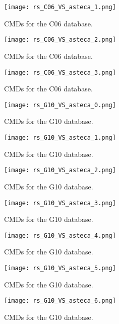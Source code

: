 \documentclass{aa}
\begin{document}
\begin{appendix}
\begin{figure*}
\texttt{[image: rs\_C06\_VS\_asteca\_1.png]}
\caption{CMDs for the C06 database.}
\label{fig:DBs_C06_1}
\end{figure*}
\clearpage

\begin{figure*}
\texttt{[image: rs\_C06\_VS\_asteca\_2.png]}
\caption{CMDs for the C06 database.}
\label{fig:DBs_C06_2}
\end{figure*}
\clearpage

\begin{figure}
\texttt{[image: rs\_C06\_VS\_asteca\_3.png]}
\caption{CMDs for the C06 database.}
\label{fig:DBs_C06_3}
\end{figure}
\clearpage

\begin{figure*}
\texttt{[image: rs\_G10\_VS\_asteca\_0.png]}
\caption{CMDs for the G10 database.}
\label{fig:DBs_G10_0}
\end{figure*}
\clearpage

\begin{figure*}
\texttt{[image: rs\_G10\_VS\_asteca\_1.png]}
\caption{CMDs for the G10 database.}
\label{fig:DBs_G10_1}
\end{figure*}
\clearpage

\begin{figure*}
\texttt{[image: rs\_G10\_VS\_asteca\_2.png]}
\caption{CMDs for the G10 database.}
\label{fig:DBs_G10_2}
\end{figure*}
\clearpage

\begin{figure*}
\texttt{[image: rs\_G10\_VS\_asteca\_3.png]}
\caption{CMDs for the G10 database.}
\label{fig:DBs_G10_3}
\end{figure*}
\clearpage

\begin{figure*}
\texttt{[image: rs\_G10\_VS\_asteca\_4.png]}
\caption{CMDs for the G10 database.}
\label{fig:DBs_G10_4}
\end{figure*}
\clearpage

\begin{figure*}
\texttt{[image: rs\_G10\_VS\_asteca\_5.png]}
\caption{CMDs for the G10 database.}
\label{fig:DBs_G10_5}
\end{figure*}
\clearpage

\begin{figure*}
\texttt{[image: rs\_G10\_VS\_asteca\_6.png]}
\caption{CMDs for the G10 database.}
\label{fig:DBs_G10_6}
\end{figure*}
\clearpage


\end{appendix}
\end{document}
